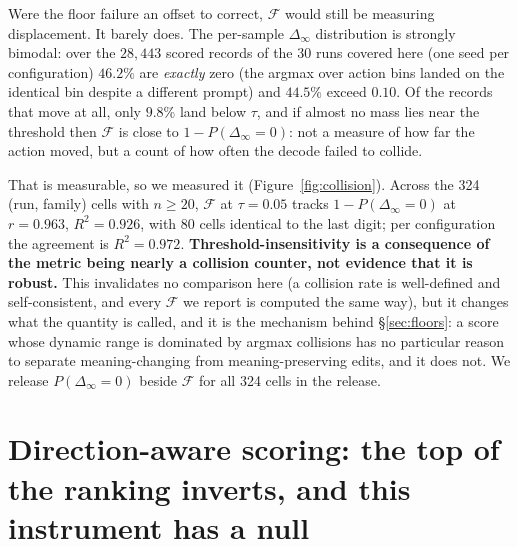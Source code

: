 \documentclass[11pt]{article}
\begin{document}
Were the floor failure an offset to correct, $\mathcal{F}$ would still be measuring displacement. It barely does. The per-sample $\Delta_\infty$ distribution is strongly bimodal: over the $28{,}443$ scored records of the 30 runs covered here (one seed per configuration) $46.2\%$ are \emph{exactly} zero (the argmax over action bins landed on the identical bin despite a different prompt) and $44.5\%$ exceed $0.10$. Of the records that move at all, only $9.8\%$ land below $\tau$, and if almost no mass lies near the threshold then $\mathcal{F}$ is close to $1 - P(\Delta_\infty = 0)$: not a measure of how far the action moved, but a count of how often the decode failed to collide.

That is measurable, so we measured it (Figure~\ref{fig:collision}). Across the 324 (run, family) cells with $n \geq 20$, $\mathcal{F}$ at $\tau{=}0.05$ tracks $1 - P(\Delta_\infty{=}0)$ at $r = 0.963$, $R^2 = 0.926$, with 80 cells identical to the last digit; per configuration the agreement is $R^2 = 0.972$. \textbf{Threshold-insensitivity is a consequence of the metric being nearly a collision counter, not evidence that it is robust.} This invalidates no comparison here (a collision rate is well-defined and self-consistent, and every $\mathcal{F}$ we report is computed the same way), but it changes what the quantity is called, and it is the mechanism behind \S\ref{sec:floors}: a score whose dynamic range is dominated by argmax collisions has no particular reason to separate meaning-changing from meaning-preserving edits, and it does not. We release $P(\Delta_\infty{=}0)$ beside $\mathcal{F}$ for all 324 cells in the release.

\section{Direction-aware scoring: the top of the ranking inverts, and this instrument has a null}
\label{sec:directional}
\end{document}
